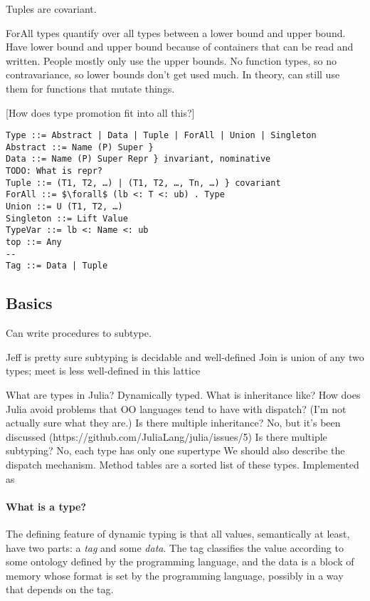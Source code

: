 Tuples are covariant.

ForAll types quantify over all types between a lower bound and upper bound. Have lower bound and upper bound because of containers that can be read and written. People mostly only use the upper bounds. No function types, so no contravariance, so lower bounds don’t get used much. In theory, can still use them for functions that mutate things.

[How does type promotion fit into all this?]

\begin{verbatim}
Type ::= Abstract | Data | Tuple | ForAll | Union | Singleton
Abstract ::= Name (P) Super }
Data ::= Name (P) Super Repr } invariant, nominative
TODO: What is repr?
Tuple ::= (T1, T2, …) | (T1, T2, …, Tn, …) } covariant
ForAll ::= $\forall$ (lb <: T <: ub) . Type
Union ::= U (T1, T2, …)
Singleton ::= Lift Value
TypeVar ::= lb <: Name <: ub
top ::= Any
--
Tag ::= Data | Tuple
\end{verbatim}

\subsection{Basics}

Can write procedures to subtype.

Jeff is pretty sure subtyping is decidable and well-defined
Join is union of any two types; meet is less well-defined in this lattice

What are types in Julia?
Dynamically typed.
What is inheritance like?
How does Julia avoid problems that OO languages tend to have with dispatch? (I’m not actually sure what they are.)
Is there multiple inheritance?
No, but it’s been discussed (https://github.com/JuliaLang/julia/issues/5)
Is there multiple subtyping?
No, each type has only one supertype
We should also describe the dispatch mechanism.
Method tables are a sorted list of these types.
Implemented as 

\paragraph{What is a type?}

The defining feature of dynamic typing is that all values, semantically at least, have
two parts: a \emph{tag} and some \emph{data}. The tag classifies the value according to
some ontology defined by the programming language, and the data is a block of memory
whose format is set by the programming language, possibly in a way that depends on the
tag.

